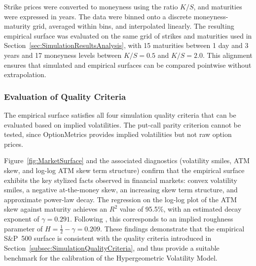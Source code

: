Strike prices were converted to moneyness using the ratio $K/S$, and maturities were expressed in years. The data were binned onto a discrete moneyness-maturity grid, averaged within bins, and interpolated linearly. The resulting empirical surface was evaluated on the same grid of strikes and maturities used in Section~\ref{sec:SimulationResultsAnalysis}, with 15 maturities between 1 day and 3 years and 17 moneyness levels between $K/S = 0.5$ and $K/S = 2.0$. This alignment ensures that simulated and empirical surfaces can be compared pointwise without extrapolation.

\subsubsection*{Evaluation of Quality Criteria}
The empirical surface satisfies all four simulation quality criteria that can be evaluated based on implied volatilities. The put-call parity criterion cannot be tested, since OptionMetrics provides implied volatilities but not raw option prices.

Figure~\ref{fig:MarketSurface} and the associated diagnostics (volatility smiles, ATM skew, and log-log ATM skew term structure) confirm that the empirical surface exhibits the key stylized facts observed in financial markets: convex volatility smiles, a negative at-the-money skew, an increasing skew term structure, and approximate power-law decay. The regression on the log-log plot of the ATM skew against maturity achieves an $R^2$ value of 95.5\%, with an estimated decay exponent of $\gamma = 0.291$. Following \citet{Fukasawa2011}, this corresponds to an implied roughness parameter of $H = \tfrac{1}{2} - \gamma = 0.209$. These findings demonstrate that the empirical S\&P~500 surface is consistent with the quality criteria introduced in Section~\ref{subsec:SimulationQualityCriteria}, and thus provide a suitable benchmark for the calibration of the Hypergeometric Volatility Model.

